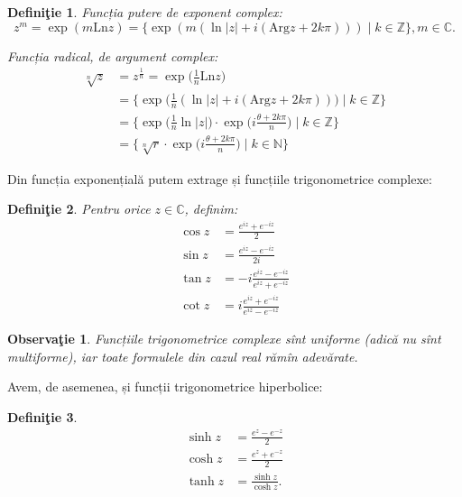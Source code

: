 \documentclass[11pt,a4paper]{article}
\newcommand\NN{\mathbb{N}}
\newcommand\ZZ{\mathbb{Z}}
\newcommand\CC{\mathbb{C}}
\theoremstyle{dotless}
\theoremstyle{dotlessdr}
\newtheorem{definition}{Defini\c{t}ie}
\newtheorem{remark}{Observa\c{t}ie}
\begin{document}
\begin{definition}\label{def:putere-radical-c}
  Funcția putere de exponent complex:
  \[
    z^m = \exp(m \mathrm{Ln}z) = \big\{ \exp(m(\ln|z| + i(\mathrm{Arg}z + 2k\pi))) %
    \mid k \in \ZZ \big\}, m \in \CC.
  \]

  Funcția radical, de argument complex:
  \begin{align*}
    \sqrt[n]{z} &= z^{\frac{1}{n}} = \exp\big( \frac{1}{n}\mathrm{Ln}z \big) \\
                &= \big\{ \exp\big( \frac{1}{n}(\ln|z| + i(\mathrm{Arg}z + 2k\pi)) \big) \mid %
                  k \in \ZZ \big\} \\
                &= \Big\{ \exp\Big(\frac{1}{n} \ln|z|\Big) \cdot %
                  \exp\Big(i \frac{\theta + 2 k\pi}{n} \Big) \mid k \in \ZZ \} \\
                &= \Big\{ \sqrt[n]{r} \cdot \exp\Big( i \frac{\theta + 2 k\pi}{n}\Big) %
                  \mid k \in \NN \Big\}
  \end{align*}
\end{definition}


Din funcția exponențială putem extrage și funcțiile trigonometrice complexe:

\begin{definition}\label{def:trig-c}
  Pentru orice $ z \in \CC $, definim:
  \begin{align*}
    \cos z &= \frac{e^{iz} + e^{-iz}}{2} \\
    \sin z &= \frac{e^{iz} - e^{-iz}}{2i} \\
    \tan z &= -i \frac{e^{iz} - e^{-iz}}{e^{iz} + e^{-iz}} \\
    \cot z &= i \frac{e^{iz} + e^{-iz}}{e^{iz} - e^{-iz}}
  \end{align*}
\end{definition}

\begin{remark}\label{rk:trig-unif}
  Funcțiile trigonometrice complexe sînt \emph{uniforme} (adică nu sînt multiforme),
  iar toate formulele din cazul real rămîn adevărate.
\end{remark}

Avem, de asemenea, și funcții trigonometrice hiperbolice:

\begin{definition}\label{def:trig-hip-c}
  \begin{align*}
    \sinh z &= \frac{e^z - e^{-z}}{2} \\
    \cosh z &= \frac{e^z + e^{-z}}{2} \\
    \tanh z &= \frac{\sinh z}{\cosh z}.
  \end{align*}
\end{definition}
\end{document}
